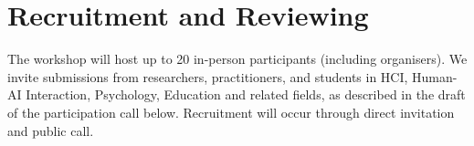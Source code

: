 \documentclass[manuscript,screen,review]{acmart}
\begin{document}
    



\section{Recruitment and Reviewing}
The workshop will host up to 20 in-person participants (including organisers). We invite submissions from researchers, practitioners, and students in HCI, Human-AI Interaction, Psychology, Education and related fields, as described in the draft of the participation call below. Recruitment will occur through direct invitation and public call. 
\end{document}
